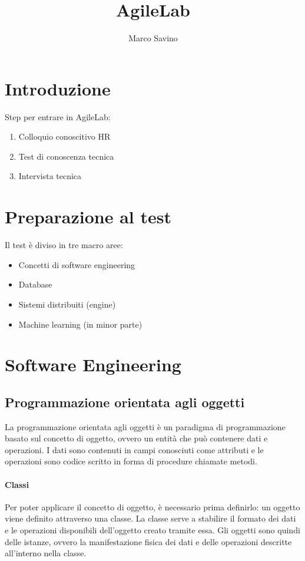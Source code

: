 \documentclass{article}
\title{AgileLab}
\author{Marco Savino}
\date{}
\begin{document}
\maketitle

\section{Introduzione}
    Step per entrare in AgileLab:
    \begin{enumerate}
        \item Colloquio conoscitivo HR
        \item Test di conoscenza tecnica
        \item Intervista tecnica
    \end{enumerate}
    
\section{Preparazione al test}
    Il test è diviso in tre macro aree:
    \begin{itemize}
        \item Concetti di software engineering
        \item Database
        \item Sistemi distribuiti (engine)
        \item Machine learning (in minor parte)
    \end{itemize}

\section{Software Engineering}
    \subsection{Programmazione orientata agli oggetti}
        La programmazione orientata agli oggetti è un paradigma di programmazione basato sul concetto di oggetto, ovvero un entità che può contenere dati e operazioni. I dati sono contenuti in campi conosciuti come attributi e le operazioni sono codice scritto in forma di procedure chiamate metodi.
        \paragraph{Classi} Per poter applicare il concetto di oggetto, è necessario prima definirlo: un oggetto viene definito attraverso una classe. La classe serve a stabilire il formato dei dati e le operazioni disponibili dell'oggetto creato tramite essa. Gli oggetti sono quindi delle istanze, ovvero la manifestazione fisica dei dati e delle operazioni descritte all'interno nella classe.
        
\end{document}
